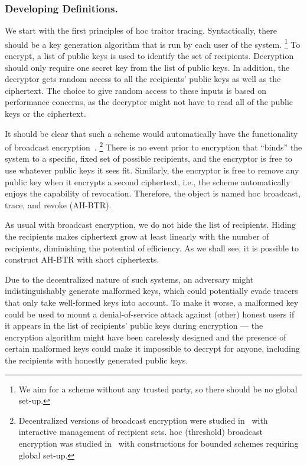 \subsubsection{Developing Definitions.}
We start with the first principles of \ad hoc traitor tracing.
Syntactically, there should be a key generation algorithm that is run by each user of the system.%
\footnote{We aim for a scheme without any trusted party, so there should be no global set-up.}
To encrypt, a list of public keys is used to identify the set of recipients.
Decryption should only require one secret key from the list of public keys.
In addition, the decryptor gets random access to all the recipients' public keys as well as the ciphertext.
The choice to give random access to these inputs is based on performance concerns, as the decryptor might not have to read all of the public keys or the ciphertext.

It should be clear that such a scheme would automatically have the functionality of broadcast encryption~\cite{C:FiaNao93}.%
\footnote{Decentralized versions of broadcast encryption were studied in~\cite{SCN:PhaPoiStr12,PAIRING:DelPaiPoi07} with interactive management of recipient sets.
\Ad hoc (threshold) broadcast encryption was studied in~\cite{DHMR08,CCS:WQZD10} with constructions for bounded schemes requiring global set-up.}
There is no event prior to encryption that ``binds'' the system to a specific, fixed set of possible recipients, and the encryptor is free to use whatever public keys it sees fit.
Similarly, the encryptor is free to remove any public key when it encrypts a second ciphertext, i.e., the scheme automatically enjoys the capability of revocation.
Therefore, the object is named \ad hoc broadcast, trace, and revoke (AH-BTR).

As usual with broadcast encryption, we do not hide the list of recipients.
Hiding the recipients makes ciphertext grow at least linearly with the number of recipients, diminishing the potential of efficiency.
As we shall see, it is possible to construct AH-BTR with short ciphertexts.

Due to the decentralized nature of such systems,
an adversary might indistinguishably generate malformed keys,
which could potentially evade tracers that only take well-formed keys into account.
To make it worse, a malformed key could be used to mount a denial-of-service attack against (other) honest users if it appears in the list of recipients' public keys during encryption ---
the encryption algorithm might have been carelessly designed and the presence of certain malformed keys could make it impossible to decrypt for anyone, including the recipients with honestly generated public keys.

